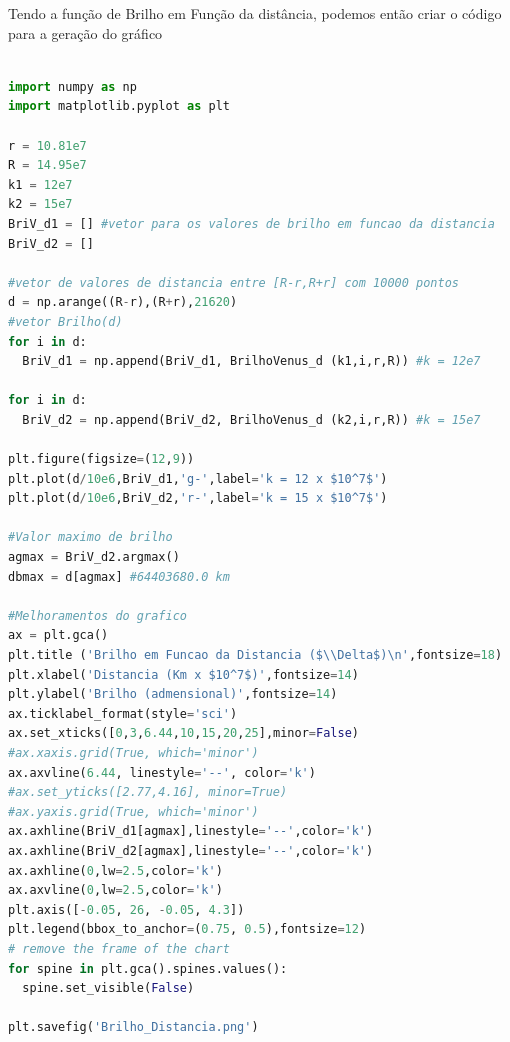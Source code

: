 \documentclass[a4paper, 12pt]{article}
\begin{document}
Tendo a função de Brilho em Função da distância, podemos então criar o código para a geração do gráfico

\begin{lstlisting}[language=Python, caption= Gráfico Brilho de Vênus ($\Delta$), label=listing_grafico_bd] 

import numpy as np
import matplotlib.pyplot as plt

r = 10.81e7
R = 14.95e7
k1 = 12e7
k2 = 15e7
BriV_d1 = [] #vetor para os valores de brilho em funcao da distancia 
BriV_d2 = []

#vetor de valores de distancia entre [R-r,R+r] com 10000 pontos
d = np.arange((R-r),(R+r),21620)
#vetor Brilho(d)
for i in d:
  BriV_d1 = np.append(BriV_d1, BrilhoVenus_d (k1,i,r,R)) #k = 12e7

for i in d:
  BriV_d2 = np.append(BriV_d2, BrilhoVenus_d (k2,i,r,R)) #k = 15e7

plt.figure(figsize=(12,9))
plt.plot(d/10e6,BriV_d1,'g-',label='k = 12 x $10^7$')
plt.plot(d/10e6,BriV_d2,'r-',label='k = 15 x $10^7$')

#Valor maximo de brilho
agmax = BriV_d2.argmax()
dbmax = d[agmax] #64403680.0 km

#Melhoramentos do grafico
ax = plt.gca()
plt.title ('Brilho em Funcao da Distancia ($\\Delta$)\n',fontsize=18)
plt.xlabel('Distancia (Km x $10^7$)',fontsize=14)
plt.ylabel('Brilho (admensional)',fontsize=14)
ax.ticklabel_format(style='sci')
ax.set_xticks([0,3,6.44,10,15,20,25],minor=False)
#ax.xaxis.grid(True, which='minor')
ax.axvline(6.44, linestyle='--', color='k')
#ax.set_yticks([2.77,4.16], minor=True)
#ax.yaxis.grid(True, which='minor')
ax.axhline(BriV_d1[agmax],linestyle='--',color='k')
ax.axhline(BriV_d2[agmax],linestyle='--',color='k')
ax.axhline(0,lw=2.5,color='k')
ax.axvline(0,lw=2.5,color='k')
plt.axis([-0.05, 26, -0.05, 4.3])
plt.legend(bbox_to_anchor=(0.75, 0.5),fontsize=12)
# remove the frame of the chart
for spine in plt.gca().spines.values():
  spine.set_visible(False) 

plt.savefig('Brilho_Distancia.png')

\end{lstlisting}
\end{document}
